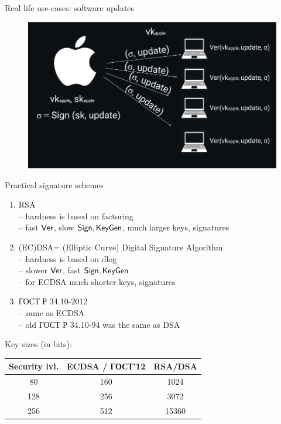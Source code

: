 \documentclass[usenames,dvipsnames, 9pt]{beamer}
\begin{document}
\begin{frame}{Real life use-cases: software updates}

\begin{figure}
	\hspace{-20pt}
	\includegraphics[width=1.1\textwidth]{Signature_software}
\end{figure}
\end{frame}

\begin{frame}{Practical signature schemes}
\Large
\begin{enumerate}
	\itemsep10pt
	\item {\color{Orange} RSA} \\
	-- hardness is based on {\color{Orange} factoring}\\
	-- fast $\textsf{Ver}$, slow $\textsf{Sign}, \textsf{KeyGen}$, much larger keys, signatures	
	\pause
	\item {\color{Orange} (EC)DSA= (Elliptic Curve) Digital Signature Algorithm} \\
	-- hardness is based on {\color{Orange} dlog}\\
	-- slower $\textsf{Ver}$, fast $\textsf{Sign}, \textsf{KeyGen}$\\
	-- for ECDSA much shorter keys, signatures	
	\pause
	\item {\color{Orange} ГОСТ Р 34.10-2012 }  \\
	-- same as ECDSA \\
	-- old ГОСТ Р 34.10-94 was the same as DSA
\end{enumerate}
\pause
\centering

Key sizes (in bits):\\[5pt]
\begin{tabular}{c | c| c}
	Security lvl. & ECDSA / ГОСТ'12 & RSA/DSA \\ \hline
	80 & 160 & 1024 \\
	128 & 256 & 3072 \\
	256 & 512 & 15360
\end{tabular}
\end{frame}
\end{document}

